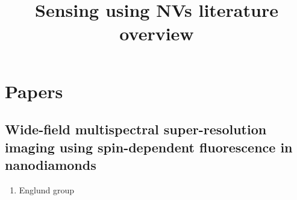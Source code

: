 \documentclass{letter}
\begin{document}
\title{Sensing using NVs literature overview}

\maketitle

\section{Papers}


\subsection{Wide-field multispectral super-resolution imaging using spin-dependent fluorescence in nanodiamonds}
\begin{enumerate}
\item Englund group
\end{enumerate}
\end{document}
